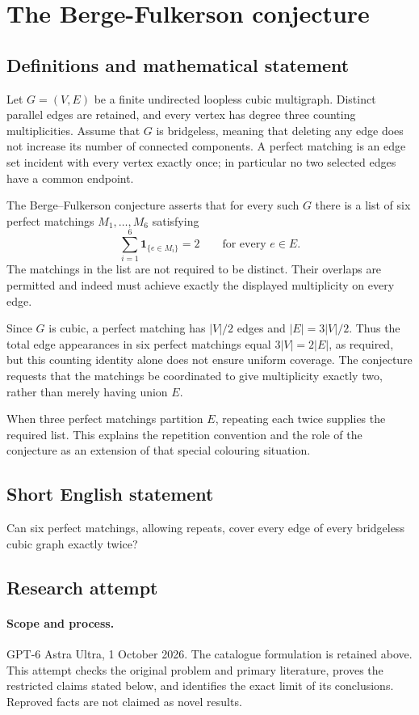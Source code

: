 \documentclass[11pt,a4paper]{article}
\begin{document}
\section*{The Berge-Fulkerson conjecture}\label{statement}

\subsection{Definitions and mathematical statement}
Let $G=(V,E)$ be a finite undirected loopless cubic
multigraph. Distinct parallel edges are retained, and
every vertex has degree three counting multiplicities.
Assume that $G$ is bridgeless, meaning that deleting any
edge does not increase its number of connected components.
A perfect matching is an edge set incident with every
vertex exactly once; in particular no two selected edges
have a common endpoint.

The Berge--Fulkerson conjecture asserts that for every
such $G$ there is a list of six perfect matchings
$M_1,\ldots,M_6$ satisfying
\[
 \sum_{i=1}^6\mathbf1_{\{e\in M_i\}}=2
 \qquad\text{for every }e\in E.
\]
The matchings in the list are not required to be distinct.
Their overlaps are permitted and indeed must achieve
exactly the displayed multiplicity on every edge.

Since $G$ is cubic, a perfect matching has $|V|/2$ edges
and $|E|=3|V|/2$. Thus the total edge appearances in six
perfect matchings equal $3|V|=2|E|$, as required, but
this counting identity alone does not ensure uniform
coverage. The conjecture requests that the matchings be
coordinated to give multiplicity exactly two, rather than
merely having union $E$.

When three perfect matchings partition $E$, repeating
each twice supplies the required list. This explains the
repetition convention and the role of the conjecture as
an extension of that special colouring situation.
\subsection{Short English statement}
Can six perfect matchings, allowing repeats, cover every edge of every bridgeless cubic graph exactly twice?
\subsection{Research attempt}
\paragraph{Scope and process.}
GPT-6 Astra Ultra, 1 October 2026. The catalogue formulation is retained above. This attempt checks the original problem and primary literature, proves the restricted claims stated below, and identifies the exact limit of its conclusions. Reproved facts are not claimed as novel results.
\end{document}
